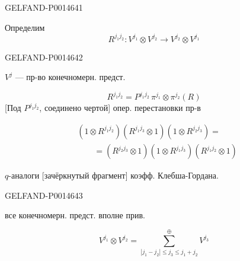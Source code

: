 \begin{GelfandAdjacentEvidence}{GELFAND-P001464}{1}

Определим
\[
R^{j_1j_2}\colon V^{j_1}\otimes V^{j_2}\longrightarrow V^{j_2}\otimes V^{j_1}
\]
\end{GelfandAdjacentEvidence}
\begin{GelfandAdjacentEvidence}{GELFAND-P001464}{2}


\(V^j\) --- пр-во конечномерн. предст.

\begin{equation*}
R^{j_1j_2}=P^{j_1j_2}\,\pi^{j_1}\otimes\pi^{j_2}(R)
\tag{13}
\end{equation*}
[Под \(P^{j_1j_2}\), соединено чертой] опер. перестановки пр-в

\begin{equation*}
\begin{aligned}
&(1\otimes R^{j_1j_2})(R^{j_1j_3}\otimes1)(1\otimes R^{j_2j_3})=\\
&\qquad=(R^{j_2j_3}\otimes1)(1\otimes R^{j_1j_3})(R^{j_1j_2}\otimes1)
\end{aligned}
\tag{14}
\end{equation*}

\(q\)-аналоги [зачёркнутый фрагмент] коэфф. Клебша-Гордана.
\end{GelfandAdjacentEvidence}
\begin{GelfandAdjacentEvidence}{GELFAND-P001464}{3}


все конечномерн. предст. вполне прив.

\begin{equation*}
V^{j_1}\otimes V^{j_2}=\sum_{|j_1-j_2|\le j_3\le j_1+j_2}^{\oplus}V^{j_3}
\tag{15}
\end{equation*}
\end{GelfandAdjacentEvidence}
